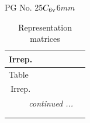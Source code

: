 \documentclass[fleqn,8pt,landscape]{jsarticle}
\begin{document}
\setcounter{MaxMatrixCols}{32}

\renewcommand{\tablename}{Table~}
\renewcommand{\figurename}{Figure~}
\begin{center}
\LARGE
PG No. 25\quad$C_{\rm 6v}$\quad$6mm$\quad[ hexagonal ]
\end{center}
\renewcommand{\arraystretch}{1.2}
\begin{longtable}{ccccccc}
\caption{Representation matrices}
 \\
 \hline \hline
Irrep. &  &  &  &  &  &  \\ \hline \endfirsthead

\multicolumn{6}{l}{\tablename\ \thetable{}} \\
 \hline \hline
Irrep. &  &  &  &  &  &  \\ \hline \endhead

 \hline \hline
\multicolumn{6}{r}{\footnotesize\it continued ...} \\ \endfoot

 \hline \hline
\multicolumn{6}{r}{} \\ \endlastfoot


\end{longtable}
\end{document}
